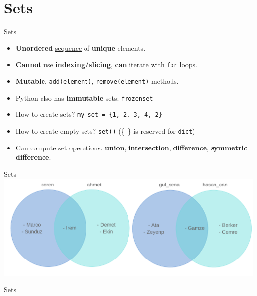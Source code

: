    \section{Sets}
    \begin{frame}{Sets}
        \LARGE
        \begin{itemize}
            \item \textbf{Unordered} \underline{sequence} of \textbf{unique} elements.
            \pause
            \item \underline{\textbf{Cannot}} use \textbf{indexing/slicing}, \textbf{can} iterate with \texttt{for} loops.
            \pause
            \item \textbf{Mutable}, \texttt{add(element)}, \texttt{remove(element)} methods.
            \pause
            \item Python also has \textbf{immutable} sets: \texttt{frozenset}
            \pause
            \item How to create sets? 
            \pause
             \texttt{my\_set = \{1, 2, 3, 4, 2\}}
            \item How to create empty sets?
            \pause
             \texttt{set()} (\{\ \} is reserved for \texttt{dict})
            \pause
            \item Can compute set operations: \textbf{union}, \textbf{intersection}, \textbf{difference}, \textbf{symmetric difference}.
        \end{itemize}
    \end{frame}
    \begin{frame}{Sets}
        \centering
        \includegraphics[width=\textwidth]{images/sections_venn.png}
    \end{frame}
    \begin{frame}{Sets}
        \inputminted[frame=single,framesep=2pt]{python3}{code-examples/sets.py}
    \end{frame}

